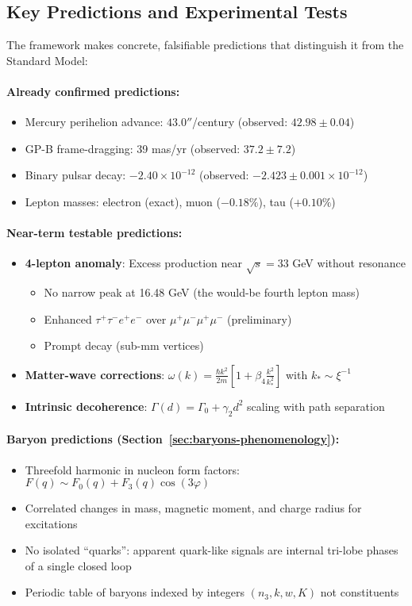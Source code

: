 \subsection{Key Predictions and Experimental Tests}

The framework makes concrete, falsifiable predictions that distinguish it from the Standard Model:

\paragraph{Already confirmed predictions:}
\begin{itemize}
\item Mercury perihelion advance: $43.0''$/century (observed: $42.98 \pm 0.04$)
\item GP-B frame-dragging: 39 mas/yr (observed: $37.2 \pm 7.2$)
\item Binary pulsar decay: $-2.40\times10^{-12}$ (observed: $-2.423 \pm 0.001\times10^{-12}$)
\item Lepton masses: electron (exact), muon ($-0.18\%$), tau ($+0.10\%$)
\end{itemize}

\paragraph{Near-term testable predictions:}
\begin{itemize}
\item \textbf{4-lepton anomaly}: Excess production near $\sqrt{s} = 33$ GeV without resonance
  \begin{itemize}
  \item No narrow peak at 16.48 GeV (the would-be fourth lepton mass)
  \item Enhanced $\tau^+\tau^-e^+e^-$ over $\mu^+\mu^-\mu^+\mu^-$ (preliminary)
  \item Prompt decay (sub-mm vertices)
  \end{itemize}
\item \textbf{Matter-wave corrections}: $\omega(k) = \frac{\hbar k^2}{2m}\left[1 + \beta_4\frac{k^2}{k_*^2}\right]$ with $k_* \sim \xi^{-1}$
\item \textbf{Intrinsic decoherence}: $\Gamma(d) = \Gamma_0 + \gamma_2 d^2$ scaling with path separation
\end{itemize}

\paragraph{Baryon predictions (Section~\ref{sec:baryons-phenomenology}):}
\begin{itemize}
\item Threefold harmonic in nucleon form factors: $F(q) \sim F_0(q) + F_3(q)\cos(3\varphi)$
\item Correlated changes in mass, magnetic moment, and charge radius for excitations
\item No isolated ``quarks'': apparent quark-like signals are internal tri-lobe phases of a single closed loop
\item Periodic table of baryons indexed by integers $(n_3, k, w, K)$ not constituents
\end{itemize}

